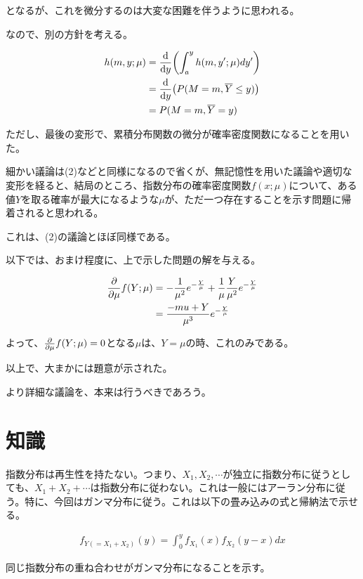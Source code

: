 \documentclass[a4paper, 10pt, dvipdfmx]{jlreq}
\begin{document}
となるが、これを微分するのは大変な困難を伴うように思われる。

なので、別の方針を考える。

\begin{align*}
    h(m,y;\mu) & =\dv{y}\qty(\int_a^y{h(m,y';\mu)}dy')  \\
               & =\dv{y}\qty(P(M=m,\overline{Y}\leq y)) \\
               & =P(M=m,\overline{Y}=y)                 \\
\end{align*}

ただし、最後の変形で、累積分布関数の微分が確率密度関数になることを用いた。

細かい議論は(2)などと同様になるので省くが、無記憶性を用いた議論や適切な変形を経ると、結局のところ、指数分布の確率密度関数$f(x;\mu)$について、ある値$Y$を取る確率が最大になるような$\mu$が、ただ一つ存在することを示す問題に帰着されると思われる。

これは、(2)の議論とほぼ同様である。

以下では、おまけ程度に、上で示した問題の解を与える。

\begin{align*}
    \pdv{\mu}f(Y;\mu) & =-\frac{1}{\mu^2}e^{-\frac{Y}{\mu}}+\frac{1}{\mu}\frac{Y}{\mu^2}e^{-\frac{Y}{\mu}} \\
                      & =\frac{-mu+Y}{\mu^3}e^{-\frac{Y}{\mu}}
\end{align*}

よって、$\pdv{\mu}f(Y;\mu)=0$となる$\mu$は、$Y=\mu$の時、これのみである。

以上で、大まかには題意が示された。

より詳細な議論を、本来は行うべきであろう。

\section{知識}

指数分布は再生性を持たない。つまり、$X_1,X_2,\cdots$が独立に指数分布に従うとしても、$X_1+X_2+\cdots$は指数分布に従わない。これは一般にはアーラン分布に従う。特に、今回はガンマ分布に従う。これは以下の畳み込みの式と帰納法で示せる。

\begin{align*}
    f_{Y(=X_1+X_2)}(y)=\int_0^{y}{f_{X_1}(x)f_{X_2}(y-x)dx}
\end{align*}

同じ指数分布の重ね合わせがガンマ分布になることを示す。
\end{document}
